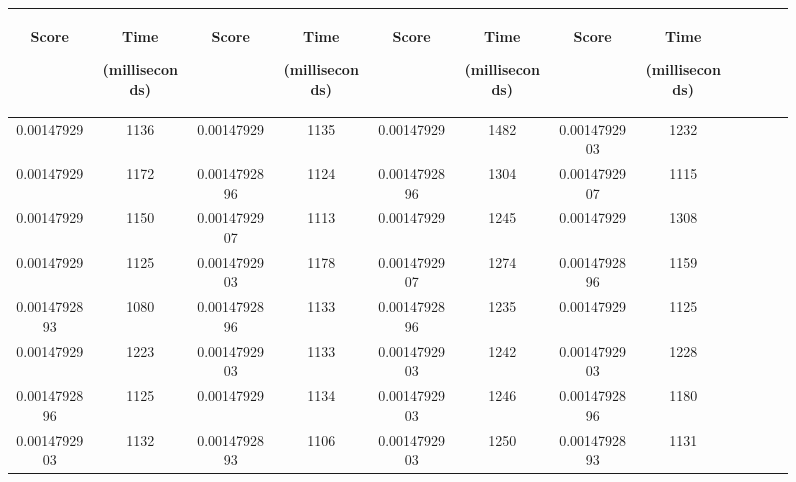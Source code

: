 \begin{figure}[h]
  \centering
  \begin{tabular}{|c|c|c|c|c|c|c|c|c|c|c|c|} 
  \midrule
 \begin{sideways}Score\end{sideways}& \begin{sideways}Time\end{sideways} \begin{sideways} (milliseconds)\end{sideways}& \begin{sideways}Score\end{sideways}& \begin{sideways}Time\end{sideways}  \begin{sideways}(milliseconds)\end{sideways}& \begin{sideways}Score\end{sideways}& \begin{sideways}Time\end{sideways}  \begin{sideways}(milliseconds)\end{sideways}& \begin{sideways}Score\end{sideways}& \begin{sideways}Time\end{sideways}  \begin{sideways} (milliseconds)\end{sideways}\\
\midrule
0.00147929&1136&0.00147929&1135&0.00147929&1482&0.0014792903&1232\\
\midrule
0.00147929&1172&0.0014792896&1124&0.0014792896&1304&0.0014792907&1115\\
\midrule
0.00147929&1150&0.0014792907&1113&0.00147929&1245&0.00147929&1308\\
\midrule
0.00147929&1125&0.0014792903&1178&0.0014792907&1274&0.0014792896&1159\\
\midrule
0.0014792893&1080&0.0014792896&1133&0.0014792896&1235&0.00147929&1125\\
\midrule
0.00147929&1223&0.0014792903&1133&0.0014792903&1242&0.0014792903&1228\\
\midrule
0.0014792896&1125&0.00147929&1134&0.0014792903&1246&0.0014792896&1180\\
\midrule
0.0014792903&1132&0.0014792893&1106&0.0014792903&1250&0.0014792893&1131\\

\end{tabular}
\end{figure}
